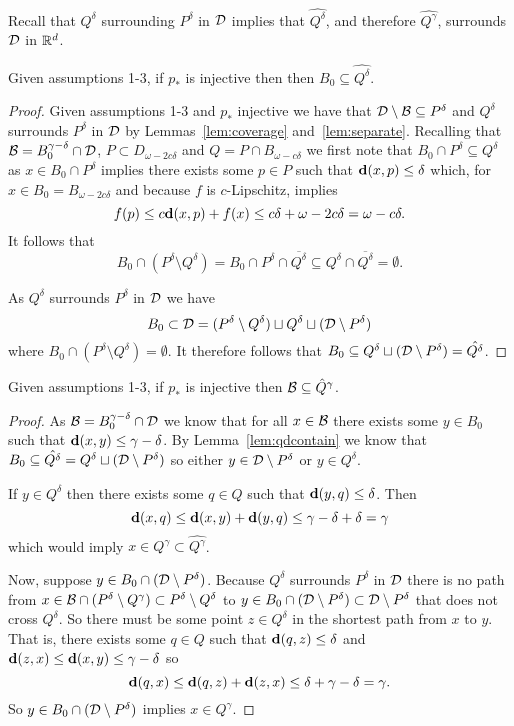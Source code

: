 Recall that $Q^\delta$ surrounding $P^\delta$ in ${\mathcal{D}}$ implies that $\hat{Q^\delta}$, and therefore $\hat{Q^\gamma}$, surrounds ${\mathcal{D}}$ in $\mathbb{R}^d$.

\begin{lemma}\label{lem:qdcontain}
  Given assumptions 1-3, if $p_*$ is injective then then $B_0\subseteq \hat{Q^\delta}$.
\end{lemma}
\begin{proof}
  Given assumptions 1-3 and $p_*$ injective we have that ${\mathcal{D}}\setminus {\mathcal{B}}\subseteq P^\delta$ and $Q^\delta$ surrounds $P^\delta$ in ${\mathcal{D}}$ by Lemmas~\ref{lem:coverage} and~\ref{lem:separate}.
  Recalling that ${\mathcal{B}} = B_0^{\gamma-\delta}\cap {\mathcal{D}}$, $P\subset D_{\omega-2c\delta}$ and $Q = P\cap B_{\omega-c\delta}$ we first note that $B_0\cap P^\delta\subseteq Q^\delta$ as $x\in B_0\cap P^\delta$ implies there exists some $p\in P$ such that $\mathbf{d}(x, p)\leq \delta$ which, for $x\in B_0 = B_{\omega-2c\delta}$ and because $f$ is $c$-Lipschitz, implies
  \[ f(p) \leq c\mathbf{d}(x, p) + f(x)\leq c\delta + \omega - 2c\delta = \omega - c\delta.\]
  It follows that
  \[B_0\cap (P^\delta\setminus Q^\delta) = B_0\cap P^\delta\cap \overline{Q^\delta} \subseteq Q^\delta\cap\overline{Q^\delta} = \emptyset.\]

  As $Q^\delta$ surrounds $P^\delta$ in ${\mathcal{D}}$ we have
  \[ B_0 \subset {\mathcal{D}} = (P^\delta\setminus Q^\delta)\sqcup Q^\delta \sqcup ({\mathcal{D}}\setminus P^\delta)\]
  where $B_0\cap (P^\delta\setminus Q^\delta) = \emptyset$.
  It therefore follows that $B_0\subseteq Q^\delta \sqcup ({\mathcal{D}}\setminus P^\delta) = \hat{Q^\delta}$.
\end{proof}

\begin{lemma}\label{lem:qcontain}
    Given assumptions 1-3, if $p_*$ is injective then ${\mathcal{B}}\subseteq \hat{Q}^\gamma$.
\end{lemma}
\begin{proof}
  As ${\mathcal{B}} = B_0^{\gamma-\delta}\cap{\mathcal{D}}$ we know that for all $x\in{\mathcal{B}}$ there exists some $y\in B_0$ such that $\mathbf{d}(x, y) \leq \gamma-\delta$.
  By Lemma~\ref{lem:qdcontain} we know that $B_0\subseteq \hat{Q^\delta} = Q^\delta\sqcup ({\mathcal{D}}\setminus P^\delta)$ so either $y\in {\mathcal{D}}\setminus P^\delta$ or $y\in Q^\delta$.

  If $y\in Q^\delta$ then there exists some $q\in Q$ such that $\mathbf{d}(y, q)\leq\delta$.
  Then
  \[ \mathbf{d}(x, q)\leq \mathbf{d}(x, y) + \mathbf{d}(y, q)\leq \gamma-\delta + \delta =\gamma \]
  which would imply $x\in Q^\gamma\subset \hat{Q^\gamma}$.

  Now, suppose $y\in B_0\cap ({\mathcal{D}}\setminus P^\delta)$.
  Because $Q^\delta$ surrounds $P^\delta$ in ${\mathcal{D}}$ there is no path from $x\in {\mathcal{B}}\cap (P^\delta\setminus Q^\gamma)\subset P^\delta\setminus Q^\delta$ to $y\in B_0\cap ({\mathcal{D}}\setminus P^\delta)\subset {\mathcal{D}}\setminus P^\delta$ that does not cross $Q^\delta$.
  So there must be some point $z\in Q^\delta$ in the shortest path from $x$ to $y$.
  That is, there exists some $q\in Q$ such that $\mathbf{d}(q, z)\leq \delta$ and $\mathbf{d}(z, x)\leq \mathbf{d}(x, y)\leq \gamma-\delta$ so
  \[ \mathbf{d}(q, x)\leq \mathbf{d}(q, z) + \mathbf{d}(z, x) \leq \delta + \gamma-\delta = \gamma. \]
  So $y\in B_0\cap ({\mathcal{D}}\setminus P^\delta)$ implies $x\in Q^\gamma$.
\end{proof}

